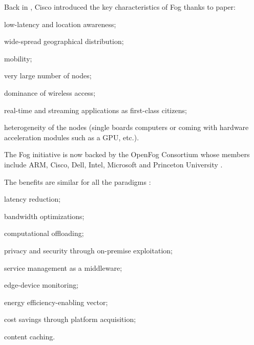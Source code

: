 \documentclass[11pt]{sdm}
\begin{document}
\begin{description}
		Back in , Cisco introduced the key characteristics of Fog thanks to  paper:
		\begin{enumerate*}[(i)]
			\item low-latency and location awareness;
			\item wide-spread geographical distribution;
			\item mobility;
			\item very large number of nodes;
			\item dominance of wireless access;
			\item real-time and streaming applications as first-class citizens;
			\item heterogeneity of the nodes (single boards computers or coming with hardware acceleration modules such as a \gls{GPU}, etc.).
		\end{enumerate*}
		The Fog initiative is now backed by the OpenFog Consortium \cite{ieee_standards_association_ieee_2018} whose members include ARM, Cisco, Dell, Intel, Microsoft and Princeton University \cite{chiang_fog_2016}.
\end{description}

The benefits are similar for all the paradigms \cite{ahmed_fog_2019, ai_edge_2018}:
\begin{enumerate*}[(1)]
	\item latency reduction;
	\item bandwidth optimizations;
	\item computational offloading;
	\item privacy and security through on-premise exploitation;
	\item service management as a middleware;
	\item edge-device monitoring;
	\item energy efficiency-enabling vector;
	\item cost savings through platform acquisition;
	\item content caching.
\end{enumerate*}

\end{document}
